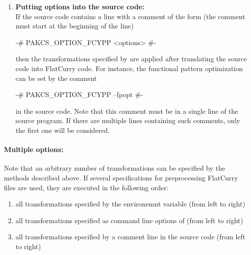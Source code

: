 \begin{enumerate}
\item {\bf Putting options into the source code:}\\
If the source code contains a line with a comment of the form (the comment
must start at the beginning of the line)
\begin{curry}
{-# PAKCS_OPTION_FCYPP <options> #-}
\end{curry}
then the transformations specified by  are applied after
translating the source code into FlatCurry code. For instance,
the functional pattern optimization can be set by the comment
\begin{curry}
{-# PAKCS_OPTION_FCYPP --fpopt #-}
\end{curry}
in the source code. Note that this comment must be in a single line 
of the source program. If there are multiple lines containing such comments,
only the first one will be considered.
\end{enumerate}
\paragraph{Multiple options:}
Note that an arbitrary number of transformations can be specified
by the methods described above.
If several specifications for preprocessing FlatCurry files are used,
they are executed in the following order:
\begin{enumerate}
\item all transformations specified by the environemnt variable
 (from left to right)
\item all transformations specified as command line options of 
   (from left to right)
\item all transformations specified by a comment line in the source code
   (from left to right)
\end{enumerate}


